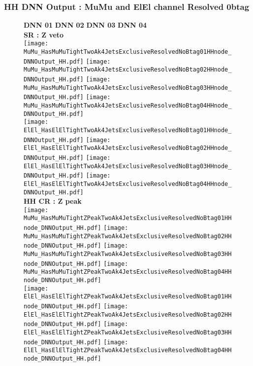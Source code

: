 \documentclass[9pt]{beamer}
\begin{document}
\begin{frame}
	\frametitle{HH DNN Output : MuMu and ElEl channel Resolved 0btag}
	\begin{figure}
	    \textbf{DNN 01} \hspace{1.2cm} \textbf{DNN 02} \hspace{1.2cm} \textbf{DNN 03} \hspace{1.2cm} \textbf{DNN 04} \\
        \centering
        \textbf{SR : Z veto} \\
		\texttt{[image: MuMu\_HasMuMuTightTwoAk4JetsExclusiveResolvedNoBtag01HHnode\_DNNOutput\_HH.pdf]}
		\texttt{[image: MuMu\_HasMuMuTightTwoAk4JetsExclusiveResolvedNoBtag02HHnode\_DNNOutput\_HH.pdf]}
		\texttt{[image: MuMu\_HasMuMuTightTwoAk4JetsExclusiveResolvedNoBtag03HHnode\_DNNOutput\_HH.pdf]}
		\texttt{[image: MuMu\_HasMuMuTightTwoAk4JetsExclusiveResolvedNoBtag04HHnode\_DNNOutput\_HH.pdf]}\\
		\texttt{[image: ElEl\_HasElElTightTwoAk4JetsExclusiveResolvedNoBtag01HHnode\_DNNOutput\_HH.pdf]}
		\texttt{[image: ElEl\_HasElElTightTwoAk4JetsExclusiveResolvedNoBtag02HHnode\_DNNOutput\_HH.pdf]}
		\texttt{[image: ElEl\_HasElElTightTwoAk4JetsExclusiveResolvedNoBtag03HHnode\_DNNOutput\_HH.pdf]}
		\texttt{[image: ElEl\_HasElElTightTwoAk4JetsExclusiveResolvedNoBtag04HHnode\_DNNOutput\_HH.pdf]}\\
        \textbf{HH CR : Z peak} \\
		\texttt{[image: MuMu\_HasMuMuTightZPeakTwoAk4JetsExclusiveResolvedNoBtag01HHnode\_DNNOutput\_HH.pdf]}
		\texttt{[image: MuMu\_HasMuMuTightZPeakTwoAk4JetsExclusiveResolvedNoBtag02HHnode\_DNNOutput\_HH.pdf]}
		\texttt{[image: MuMu\_HasMuMuTightZPeakTwoAk4JetsExclusiveResolvedNoBtag03HHnode\_DNNOutput\_HH.pdf]}
		\texttt{[image: MuMu\_HasMuMuTightZPeakTwoAk4JetsExclusiveResolvedNoBtag04HHnode\_DNNOutput\_HH.pdf]}\\
		\texttt{[image: ElEl\_HasElElTightZPeakTwoAk4JetsExclusiveResolvedNoBtag01HHnode\_DNNOutput\_HH.pdf]}
		\texttt{[image: ElEl\_HasElElTightZPeakTwoAk4JetsExclusiveResolvedNoBtag02HHnode\_DNNOutput\_HH.pdf]}
		\texttt{[image: ElEl\_HasElElTightZPeakTwoAk4JetsExclusiveResolvedNoBtag03HHnode\_DNNOutput\_HH.pdf]}
		\texttt{[image: ElEl\_HasElElTightZPeakTwoAk4JetsExclusiveResolvedNoBtag04HHnode\_DNNOutput\_HH.pdf]}\\
	\end{figure}
\end{frame}
\end{document}
